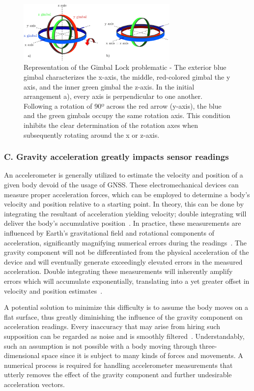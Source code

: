 \begin{figure}[!h]
    \centering
    \includegraphics[width=0.7\textwidth]{figures/gimbal_lock.png}
    \caption{Representation of the Gimbal Lock problematic \cite{zeitlhofler2019nominal} - The exterior blue gimbal characterizes the x-axis, the middle, red-colored gimbal the y axis, and the inner green gimbal the z-axis. In the initial arrangement a), every axis is perpendicular to one another. Following a rotation of 90º across the red arrow (y-axis), the blue and the green gimbals occupy the same rotation axis. This condition inhibits the clear determination of the rotation axes when subsequently rotating around the x or z-axis. }
    \label{fig:gimballock}
\end{figure}

\subsubsection{C. Gravity acceleration greatly impacts sensor readings}
An accelerometer is generally utilized to estimate the velocity and position of a given body devoid of the usage of GNSS. These electromechanical devices can measure proper acceleration forces, which can be employed to determine a body's velocity and position relative to a starting point. In theory, this can be done by integrating the resultant of acceleration yielding velocity; double integrating will deliver the body's accumulative position~\cite{yang2006simple}. In practice, these measurements are influenced by Earth's gravitational field and rotational components of acceleration, significantly magnifying numerical errors during the readings~\cite{nistler2011gravity}. The gravity component will not be differentiated from the physical acceleration of the device and will eventually generate exceedingly elevated errors in the measured acceleration. Double integrating these measurements will inherently amplify errors which will accumulate exponentially, translating into a yet greater offset in velocity and position estimates~\cite{thong2004numerical}.

A potential solution to minimize this difficulty is to assume the body moves on a flat surface, thus greatly diminishing the influence of the gravity component on acceleration readings. Every inaccuracy that may arise from hiring such supposition can be regarded as noise and is smoothly filtered~\cite{nistler2011gravity}. Understandably, such an assumption is not possible with a body moving through three-dimensional space since it is subject to many kinds of forces and movements.  A numerical process is required for handling accelerometer measurements that utterly removes the effect of the gravity component and further undesirable acceleration vectors.




